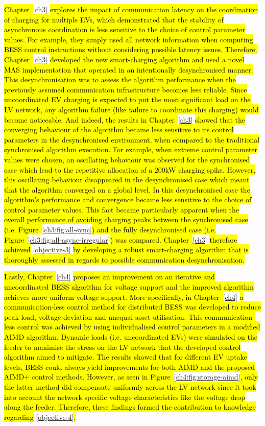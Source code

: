 \hl{Chapter~}\ref{ch3}\hl{ explores the impact of communication latency on the coordination of charging for multiple EVs, which demonstrated that the stability of asynchronous coordination is less sensitive to the choice of control parameter values.
For example, they simply used all network information when computing BESS control instructions without considering possible latency issues.
Therefore, Chapter~}\ref{ch3}\hl{ developed the new smart-charging algorithm and used a novel MAS implementation that operated in an intentionally desynchronised manner.
This desynchronisation was to assess the algorithm performance when the previously assumed communication infrastructure becomes less reliable.
Since uncoordinated EV charging is expected to put the most significant load on the LV network, any algorithm failure (like failure to coordinate this charging) would become noticeable.
And indeed, the results in Chapter~}\ref{ch3}\hl{ showed that the converging behaviour of the algorithm became less sensitive to its control parameters in the desynchronised environment, when compared to the traditional synchronised algorithm execution.
For example, when extreme control parameter values were chosen, an oscillating behaviour was observed for the synchronised case which lead to the repetitive allocation of a 200kW charging spike.
However, this oscillating behaviour disappeared in the desynchronised case which meant that the algorithm converged on a global level.
In this desynchronised case the algorithm's performance and convergence became less sensitive to the choice of control parameter values.
This fact became particularly apparent when the overall performance of avoiding charging peaks between the synchronised case (i.e. Figure~}\ref{ch3:fig:all-sync}\hl{) and the fully desynchronised case (i.e. Figure~}\ref{ch3:fig:all-async-irregular}\hl{) was compared.
Chapter~}\ref{ch3}\hl{ therefore achieved }\ref{objective-3}\hl{ by developing a robust smart-charging algorithm that is thoroughly assessed in regards to possible communication desynchronisation.}

\hl{Lastly, Chapter~}\ref{ch4}\hl{ proposes an improvement on an iterative and uncoordinated BESS algorithm for voltage support and the improved algorithm achieves more uniform voltage support.
More specifically, in Chapter~}\ref{ch4}\hl{ a communication-less control method for distributed BESS was developed to reduce peak load, voltage deviation and unequal asset utilisation.
This communication-less control was achieved by using individualised control parameters in a modified AIMD algorithm.
Dynamic loads (i.e. uncoordinated EVs) were simulated on the feeder to maximise the stress on the LV network that the developed control algorithm aimed to mitigate.
The results showed that for different EV uptake levels, BESS could always yield improvements for both AIMD and the proposed AIMD+ control methods.
However, as seen in Figure~}\ref{ch4:fig:storage-aimd}\hl{, only the latter method did compensate uniformly across the LV network since it took into account the network specific voltage characteristics like the voltage drop along the feeder.
Therefore, these findings formed the contribution to knowledge regarding }\ref{objective-4}\hl{.}

